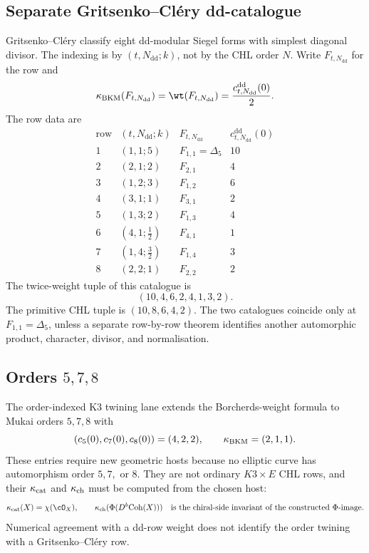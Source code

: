 \subsection*{Separate Gritsenko--Cl\'ery dd-catalogue}

Gritsenko--Cl\'ery classify eight dd-modular Siegel forms with simplest
diagonal divisor.  The indexing is by \((t,N_{\mathrm{dd}};k)\), not by
the CHL order \(N\).  Write \(F_{t,N_{\mathrm{dd}}}\) for the row and
\[
  \kBKM(F_{t,N_{\mathrm{dd}}})=\wt(F_{t,N_{\mathrm{dd}}})
  =\frac{c^{\mathrm{dd}}_{t,N_{\mathrm{dd}}}(0)}{2}.
\]
The row data are
\[
\begin{array}{c|c|c|c}
\text{row} & (t,N_{\mathrm{dd}};k) & F_{t,N_{\mathrm{dd}}}
  & c^{\mathrm{dd}}_{t,N_{\mathrm{dd}}}(0)\\
\hline
1 & (1,1;5) & F_{1,1}=\Delta_5 & 10\\
2 & (2,1;2) & F_{2,1} & 4\\
3 & (1,2;3) & F_{1,2} & 6\\
4 & (3,1;1) & F_{3,1} & 2\\
5 & (1,3;2) & F_{1,3} & 4\\
6 & (4,1;\tfrac12) & F_{4,1} & 1\\
7 & (1,4;\tfrac32) & F_{1,4} & 3\\
8 & (2,2;1) & F_{2,2} & 2
\end{array}
\]
The twice-weight tuple of this catalogue is
\[
  (10,4,6,2,4,1,3,2).
\]
The primitive CHL tuple is \((10,8,6,4,2)\).  The two catalogues
coincide only at \(F_{1,1}=\Delta_5\), unless a separate row-by-row
theorem identifies another automorphic product, character, divisor, and
normalisation.

\subsection*{Orders \(5,7,8\)}

The order-indexed K3 twining lane extends the Borcherds-weight formula
to Mukai orders \(5,7,8\) with
\[
  (c_5(0),c_7(0),c_8(0))=(4,2,2),\qquad
  \kappa_{\mathrm{BKM}}=(2,1,1).
\]
These entries require new geometric hosts because no elliptic curve has
automorphism order \(5,7,\) or \(8\).  They are not ordinary
\(K3\times E\) CHL rows, and their \(\kappa_{\mathrm{cat}}\) and \(\kappa_{\mathrm{ch}}\) must be
computed from the chosen host:
\[
  \kcat(X)=\chi(\cO_X),\qquad
  \kch(\Phi(D^b\mathrm{Coh}(X)))
  \quad\text{is the chiral-side invariant of the constructed }\Phi\text{-image}.
\]
Numerical agreement with a dd-row weight does not identify the order
twining with a Gritsenko--Cl\'ery row.

